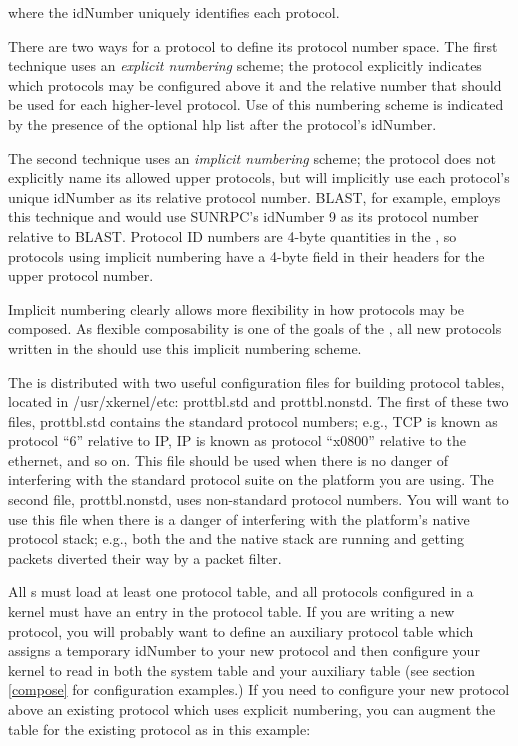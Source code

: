 \medskip

\noindent where the idNumber uniquely identifies each protocol.

There are two ways for a protocol to define its protocol
number space.  
The first technique uses an {\em explicit numbering} scheme; the
protocol explicitly indicates which protocols may be configured above
it and the relative number that should be used for each higher-level
protocol.  
Use of this numbering scheme
is indicated by the presence of the optional hlp list after the
protocol's idNumber.

The second technique uses an {\em implicit numbering} scheme; the
protocol does not explicitly name its allowed upper protocols, but
will implicitly use each protocol's unique idNumber as its relative protocol
number.  BLAST, for example, employs this technique and would use
SUNRPC's idNumber 9 as its protocol number relative to BLAST.
Protocol ID numbers are 4-byte quantities in the \xk{}, so protocols 
using implicit numbering have a 4-byte field in their headers for the
upper protocol number.

Implicit numbering clearly allows more flexibility in how protocols
may be composed.  As flexible composability is one of the goals of the
\xk{}, all new protocols written in the \xk{} should use this implicit
numbering scheme.

The \xk{} is distributed with two useful configuration files for
building protocol tables, located in {\sanss /usr/xkernel/etc}: 
{\sanss prottbl.std} and {\sanss
prottbl.nonstd}.  The first of these two files, {\sanss
prottbl.std} contains the standard protocol numbers; e.g., TCP is
known as protocol ``6'' relative to IP, IP is known as protocol ``x0800''
relative to the ethernet, and so on. This file should be used when
there is no danger of interfering with the standard protocol suite on
the platform you are using. The second file, {\sanss prottbl.nonstd},
uses non-standard protocol numbers. You will want to use this file
when there is a danger of interfering with the platform's native
protocol stack; e.g., both the \xk{} and the native stack are running
and getting packets diverted their way by a packet filter.


All \xk{}s must load at least one protocol table, and 
all protocols configured in a kernel must have an entry in the
protocol table.   
If you are
writing a new protocol, you will probably want to define an auxiliary
protocol table which assigns a temporary idNumber to your new protocol
and then configure your kernel to read in both the system table and
your auxiliary table (see section \ref{compose} for configuration
examples.)  If you need to configure your new protocol above an
existing protocol which uses explicit numbering, you can augment the
table for the existing protocol as in this example:


